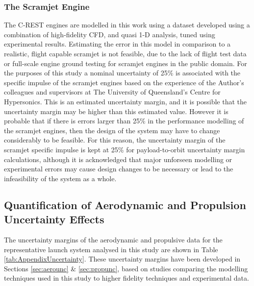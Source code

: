 \subsubsection{The Scramjet Engine}


The C-REST engines are modelled in this work using a dataset developed using a combination of high-fidelity CFD, and quasi 1-D analysis, tuned using experimental results\cite{Jazra2010}. Estimating the error in this model in comparison to a realistic, flight capable scramjet is not feasible, due to the lack of flight test data or full-scale engine ground testing for scramjet engines in the public domain. For the purposes of this study a nominal uncertainty of 25\% is associated with the specific impulse of the scramjet engines based on the experience of the Author's colleagues and supervisors at The University of Queensland's Centre for Hypersonics. This is an estimated uncertainty margin, and it is possible that the uncertainty margin may be higher than this estimated value. However it is probable that if there is errors larger than 25\% in the performance modelling of the scramjet engines, then the design of the system may have to change considerably to be feasible. For this reason, the uncertainty margin of the scramjet specific impulse is kept at 25\% for payload-to-orbit uncertainty margin calculations, although it is acknowledged that major unforseen modelling or experimental errors may cause design changes to be necessary or lead to the infeasibility of the system as a whole. 


\subsection{Quantification of Aerodynamic and Propulsion Uncertainty Effects}


The uncertainty margins of the aerodynamic and propulsive data for the representative launch system analysed in this study are shown in Table \ref{tab:AppendixUncertainty}. These uncertainty margins have been developed in Sections \ref{sec:aerounc} \& \ref{sec:propunc}, based on studies comparing the modelling techniques used in this study to higher fidelity techniques and experimental data.  

